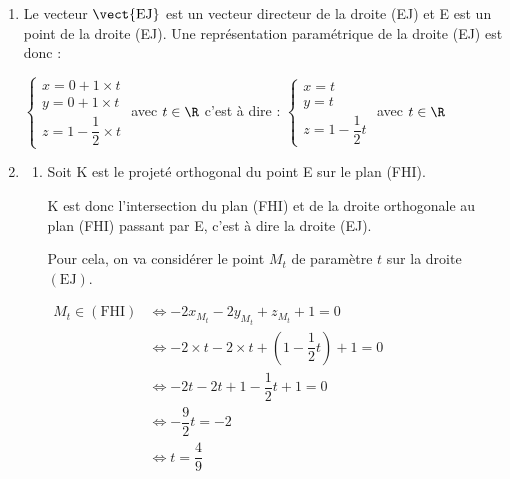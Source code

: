 \begin{enumerate}
Une équation cartésienne du plan (FHI)  est donc de la forme : \quad   $-2x-2y+z+d=0$ avec $d \in \R$.

De plus, le point F appartient au plan (FHI) donc ses coordonnées verifient l'équation du plan. On a donc :

$\begin{aligned}[t] \mathrm{F} \in (\mathrm{FHI}) &\iff -2\times x_\mathrm{F}  -2 \times y_\mathrm{F} + z_\mathrm{F} +d=0 \\
	&\iff -2\times 1  -2 \times 0 + 1 +d=0 \\
	&\iff -2+1+d=0 \\
	&\iff d=1\end{aligned}$

Une équation cartésienne du plan (FHI) est donc	$-2x-2y+ z+1=0$.
 \item Le vecteur $\vect{\text{EJ}} $ est un vecteur directeur de la droite (EJ) et E est un point de la droite (EJ).  Une représentation paramétrique de la droite (EJ) est donc :

$\begin{cases} x= 0 + 1\times t \\ y=0 + 1 \times t  \\ z=1 - \dfrac{1}{2} \times t  \end{cases} $ avec $t \in \R$ \quad c'est à dire \quad : $\begin{cases} x= t \\ y=t  \\ z=1 - \dfrac{1}{2} t  \end{cases} $ avec $t \in \R$

	\item
	\begin{enumerate}
		\item Soit K est le projeté orthogonal du point E sur le plan (FHI).

K est donc l'intersection du plan (FHI) et de la droite orthogonale au plan (FHI) passant par E, c'est à dire la droite (EJ).

Pour cela, on va considérer le point $M_t$ de paramètre $t$ sur la droite $(\mathrm{EJ})$.

$\begin{aligned} M_t \in (\mathrm{FHI}) &\iff -2x_{M_t} -2y_{M_t}+z_{M_t} +1 = 0\\
&\iff -2\times t -2  \times t  +  \left( 1- \dfrac{1}{2}t\right) +1=0 \\
&\iff -2t-2t+1-\dfrac{1}{2}t+1=0 \\
&\iff -\dfrac{9}{2}t = -2 \\
&\iff t= \dfrac{4}{9} \end{aligned}$


\end{enumerate}
\end{enumerate}
